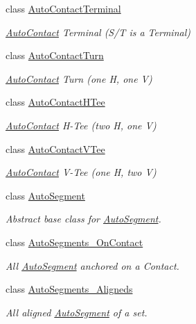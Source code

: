 \begin{DoxyCompactItemize}
class \hyperlink{classKatabatic_1_1AutoContactTerminal}{Auto\-Contact\-Terminal}
\begin{DoxyCompactList}\small\item\em \hyperlink{classKatabatic_1_1AutoContact}{Auto\-Contact} Terminal (S/\-T is a Terminal) \end{DoxyCompactList}\item 
class \hyperlink{classKatabatic_1_1AutoContactTurn}{Auto\-Contact\-Turn}
\begin{DoxyCompactList}\small\item\em \hyperlink{classKatabatic_1_1AutoContact}{Auto\-Contact} Turn (one H, one V) \end{DoxyCompactList}\item 
class \hyperlink{classKatabatic_1_1AutoContactHTee}{Auto\-Contact\-H\-Tee}
\begin{DoxyCompactList}\small\item\em \hyperlink{classKatabatic_1_1AutoContact}{Auto\-Contact} H-\/\-Tee (two H, one V) \end{DoxyCompactList}\item 
class \hyperlink{classKatabatic_1_1AutoContactVTee}{Auto\-Contact\-V\-Tee}
\begin{DoxyCompactList}\small\item\em \hyperlink{classKatabatic_1_1AutoContact}{Auto\-Contact} V-\/\-Tee (one H, two V) \end{DoxyCompactList}\item 
class \hyperlink{classKatabatic_1_1AutoSegment}{Auto\-Segment}
\begin{DoxyCompactList}\small\item\em Abstract base class for \hyperlink{classKatabatic_1_1AutoSegment}{Auto\-Segment}. \end{DoxyCompactList}\item 
class \hyperlink{classKatabatic_1_1AutoSegments__OnContact}{Auto\-Segments\-\_\-\-On\-Contact}
\begin{DoxyCompactList}\small\item\em All \hyperlink{classKatabatic_1_1AutoSegment}{Auto\-Segment} anchored on a Contact. \end{DoxyCompactList}\item 
class \hyperlink{classKatabatic_1_1AutoSegments__Aligneds}{Auto\-Segments\-\_\-\-Aligneds}
\begin{DoxyCompactList}\small\item\em All aligned \hyperlink{classKatabatic_1_1AutoSegment}{Auto\-Segment} of a set. \end{DoxyCompactList}\item 

\end{DoxyCompactItemize}
